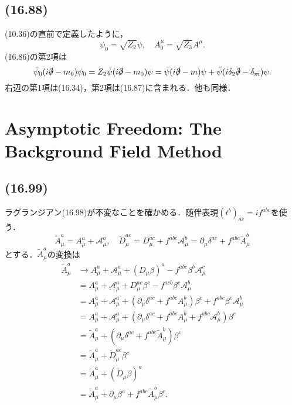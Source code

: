 \subsection{(16.88)}
(10.36)の直前で定義したように，
\[ \psi_0 = \sqrt{Z_2} \psi , \quad A^\mu_0 = \sqrt{Z_3} A^\mu . \]
(16.86)の第2項は
\[
\bar\psi_0 (i\slashed\partial - m_0) \psi_0 = Z_2 \bar\psi (i\slashed\partial - m_0) \psi
= \bar\psi (i\slashed\partial - m) \psi + \bar\psi (i\delta_2\slashed\partial - \delta_m) \psi .
\]
右辺の第1項は(16.34)，第2項は(16.87)に含まれる．他も同様．

\section{Asymptotic Freedom: The Background Field Method}
\subsection{(16.99)}
ラグランジアン(16.98)が不変なことを確かめる．随伴表現$(t^b)_{ac} = i f^{abc}$を使う．
\[
\tilde{A}_\mu^a = A_\mu^a + \mathcal{A}_\mu^a , \quad
\tilde{D}_\mu^{ac} = D_\mu^{ac} + f^{abc}\mathcal{A}_\mu^b = \partial_\mu\delta^{ac} + f^{abc}\tilde{A}_\mu^b
\]
とする．$\tilde{A}_\mu^a$の変換は
\begin{align*}
  \tilde{A}_\mu^a &\to A_\mu^a + \mathcal{A}_\mu^a + (D_\mu \beta)^a - f^{abc} \beta^b \mathcal{A}_\mu^c \\
  &= A_\mu^a + \mathcal{A}_\mu^a + D_\mu^{ac} \beta^c - f^{acb} \beta^c \mathcal{A}_\mu^b \\
  &= A_\mu^a + \mathcal{A}_\mu^a + (\partial_\mu\delta^{ac} + f^{abc}A_\mu^b) \beta^c + f^{abc} \beta^c \mathcal{A}_\mu^b \\
  &= A_\mu^a + \mathcal{A}_\mu^a + (\partial_\mu\delta^{ac} + f^{abc}A_\mu^b + f^{abc}\mathcal{A}_\mu^b) \beta^c \\
  &= \tilde{A}_\mu^a + (\partial_\mu\delta^{ac} + f^{abc}\tilde{A}_\mu^b) \beta^c \\
  &= \tilde{A}_\mu^a + \tilde{D}_\mu^{ac} \beta^c \\
  &= \tilde{A}_\mu^a + (\tilde{D}_\mu \beta)^a \\
  &= \tilde{A}_\mu^a + \partial_\mu\beta^a + f^{abc}\tilde{A}_\mu^b \beta^c .
\end{align*}

